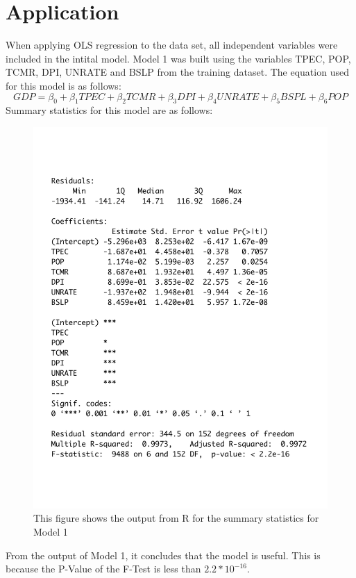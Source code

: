 \documentclass[12pt]{article}
\begin{document}
\section*{Application}
When applying OLS regression to the data set, all independent variables were included in the intital model.
Model 1 was built using the variables TPEC, POP, TCMR, DPI, UNRATE and BSLP from the training dataset. 
The equation used for this model is as follows:
\begin{equation}
  GDP = \beta_0 + \beta_1 TPEC + \beta_2 TCMR+ \beta_3 DPI + \beta_4 UNRATE + \beta_5 BSPL +\beta_6 POP
\end{equation}
Summary statistics for this model are as follows:
\begin{figure}[H]
  \centering
  \includegraphics[scale = .35]{mod1output}
  \caption{This figure shows the output from R for the summary statistics for Model 1}
\end{figure}
From the output of Model 1, it concludes that the model is useful.
This is because the P-Value of the F-Test is less than $2.2 * 10^{-16}$.
\end{document}
